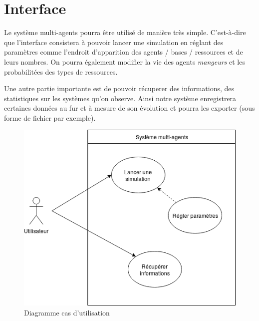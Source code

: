 \documentclass{article}
\begin{document}
\newpage
\section{Interface}
Le système multi-agents pourra être utilisé de manière très simple. C'est-à-dire
que l'interface consistera à pouvoir lancer une simulation en réglant des paramètres
comme l'endroit d'apparition des agents / bases / ressources et de leurs nombres. On
pourra également modifier la vie des agents \emph{mangeurs} et les probabilitées des
types de ressources.

Une autre partie importante est de pouvoir récuperer des informations, des statistiques
sur les systèmes qu'on observe. Ainsi notre système enregistrera certaines données
au fur et à mesure de son évolution et pourra les exporter (sous forme de fichier
par exemple).

\begin{figure}[!ht]
  \centering
  \caption{Diagramme cas d'utilisation}
  \includegraphics[scale=0.70]{img/usecase.png}
\end{figure}
\end{document}
